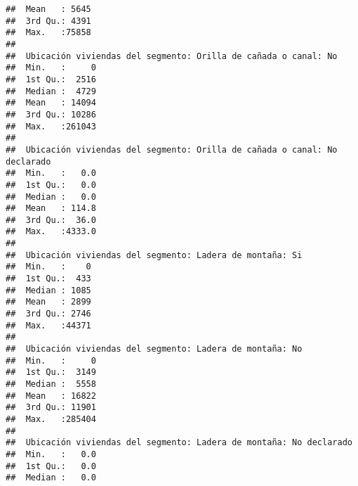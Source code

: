 \documentclass[11pt,]{article}
\begin{document}
\begin{verbatim}
##  Mean   : 5645                                                 
##  3rd Qu.: 4391                                                 
##  Max.   :75858                                                 
##                                                                
##  Ubicación viviendas del segmento: Orilla de cañada o canal: No
##  Min.   :     0                                                
##  1st Qu.:  2516                                                
##  Median :  4729                                                
##  Mean   : 14094                                                
##  3rd Qu.: 10286                                                
##  Max.   :261043                                                
##                                                                
##  Ubicación viviendas del segmento: Orilla de cañada o canal: No declarado
##  Min.   :   0.0                                                          
##  1st Qu.:   0.0                                                          
##  Median :   0.0                                                          
##  Mean   : 114.8                                                          
##  3rd Qu.:  36.0                                                          
##  Max.   :4333.0                                                          
##                                                                          
##  Ubicación viviendas del segmento: Ladera de montaña: Si
##  Min.   :    0                                          
##  1st Qu.:  433                                          
##  Median : 1085                                          
##  Mean   : 2899                                          
##  3rd Qu.: 2746                                          
##  Max.   :44371                                          
##                                                         
##  Ubicación viviendas del segmento: Ladera de montaña: No
##  Min.   :     0                                         
##  1st Qu.:  3149                                         
##  Median :  5558                                         
##  Mean   : 16822                                         
##  3rd Qu.: 11901                                         
##  Max.   :285404                                         
##                                                         
##  Ubicación viviendas del segmento: Ladera de montaña: No declarado
##  Min.   :   0.0                                                   
##  1st Qu.:   0.0                                                   
##  Median :   0.0                                                   

\end{verbatim}
\end{document}
